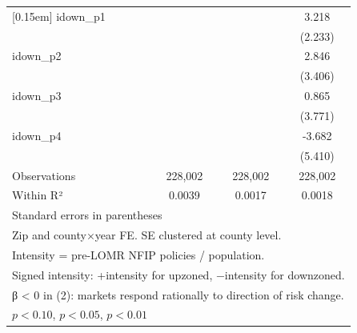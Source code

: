 \begin{table}[htbp]
\begin{tabular}{l*{3}{c}}
[0.15em]
idown\_p1            &                     &                     &       3.218         \\
                    &                     &                     &     (2.233)         \\
[0.15em]
idown\_p2            &                     &                     &       2.846         \\
                    &                     &                     &     (3.406)         \\
[0.15em]
idown\_p3            &                     &                     &       0.865         \\
                    &                     &                     &     (3.771)         \\
[0.15em]
idown\_p4            &                     &                     &      -3.682         \\
                    &                     &                     &     (5.410)         \\
\hline
Observations        &     228,002         &     228,002         &     228,002         \\
Within R²           &      0.0039         &      0.0017         &      0.0018         \\
\hline\hline
\multicolumn{4}{l}{\footnotesize Standard errors in parentheses}\\
\multicolumn{4}{l}{\footnotesize Zip and county×year FE. SE clustered at county level.}\\
\multicolumn{4}{l}{\footnotesize Intensity = pre-LOMR NFIP policies / population.}\\
\multicolumn{4}{l}{\footnotesize Signed intensity: +intensity for upzoned, −intensity for downzoned.}\\
\multicolumn{4}{l}{\footnotesize β < 0 in (2): markets respond rationally to direction of risk change.}\\
\multicolumn{4}{l}{\footnotesize \sym{*} \(p<0.10\), \sym{**} \(p<0.05\), \sym{***} \(p<0.01\)}\\
\end{tabular}
\end{table}

